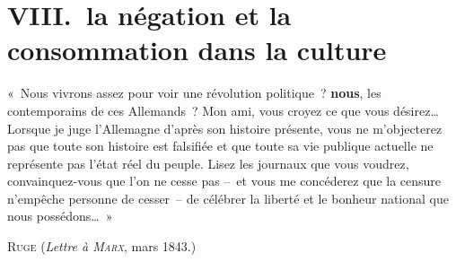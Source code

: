 \documentclass[french,twoside]{book} %
\newcommand\surname[1]{\textsc{#1}}
\newcommand\term[1]{\textbf{#1}}
\newcommand{\bibl}[1]{{\smallskip\RaggedLeft\normalsize\normalfont #1\par\medskip}}}
\newenvironment{epigraph}{\begin{addmargin}[2\parindent]{0em}\sffamily\large\setstretch{0.95}}{\end{addmargin}\bigskip}
\newcommand\chapteropen{} %
\begin{document}
\chapteropen

\chapter[{VIII. la négation et la consommation dans la culture}]{VIII. la négation et la consommation dans la culture}
\renewcommand{\leftmark}{VIII. la négation et la consommation dans la culture}


\begin{epigraph}
\noindent « Nous vivrons assez pour voir une révolution politique ? \term{nous}, les contemporains de ces Allemands ? Mon ami, vous croyez ce que vous désirez… Lorsque je juge l’Allemagne d’après son histoire présente, vous ne m’objecterez pas que toute son histoire est falsifiée et que toute sa vie publique actuelle ne représente pas l’état réel du peuple. Lisez les journaux que vous voudrez, convainquez-vous que l’on ne cesse pas – et vous me concéderez que la censure n’empêche personne de cesser – de célébrer la liberté et le bonheur national que nous possédons… »\par

\bibl{\surname{Ruge} (\emph{Lettre à \surname{Marx}}, mars 1843.)}
\end{epigraph}
\end{document}
